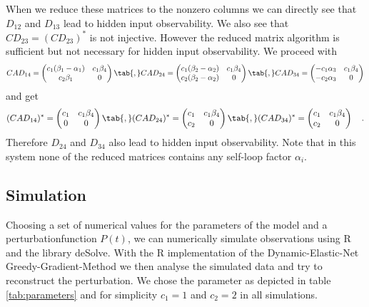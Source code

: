 When we reduce these matrices to the nonzero columns we can directly see that $D_{12}$ and 
$D_{13}$ lead to hidden input observability. We also see that $CD_{23}=(CD_{23})^*$ is not 
injective. However the reduced matrix algorithm is sufficient but not necessary for hidden 
input observability. We proceed with
\begin{equation*}
CAD_{14} = \begin{pmatrix} c_1(\beta_1-\alpha_1) & c_1 \beta_4 \\ c_2\beta_1 & 
0\end{pmatrix} \tab{,}
CAD_{24} = \begin{pmatrix} c_1(\beta_2-\alpha_2) & c_1 \beta_4 \\ c_2(\beta_2-\alpha_2) & 0 
\end{pmatrix} \tab{,}
CAD_{34} = \begin{pmatrix} -c_1\alpha_3 & c_1\beta_4 \\ -c_2\alpha_3 & 0      \end{pmatrix} 
\end{equation*}
and get
\begin{equation*}
(CAD_{14})^* = \begin{pmatrix} c_1 & c_1 \beta_4 \\ 0 & 0\end{pmatrix} \tab{,}
(CAD_{24})^* = \begin{pmatrix} c_1 & c_1 \beta_4 \\ c_2& 0 
\end{pmatrix} \tab{,}
(CAD_{34})^* = \begin{pmatrix} c_1 & c_1\beta_4 \\ c_2 & 0      \end{pmatrix}  \quad .
\end{equation*}
Therefore $D_{24}$ and $D_{34}$ also lead to hidden input observability.
Note that in this system none of the reduced matrices contains any self-loop factor 
$\alpha_i$.

\clearpage
\subsection*{Simulation}
Choosing a set of numerical values for the parameters of the model and a 
perturbationfunction $P(t)$, we can numerically 
simulate observations using \textsf{R} and the library \textsf{deSolve}. With the 
\textsf{R} implementation of the \textsf{Dynamic-Elastic-Net} 
\textsf{Greedy-Gradient-Method} we 
then analyse the simulated data and try to reconstruct the perturbation. We chose the 
parameter as depicted in table \ref{tab:parameters} and for simplicity $c_1=1$ 
and $c_2=2$ in all simulations.

